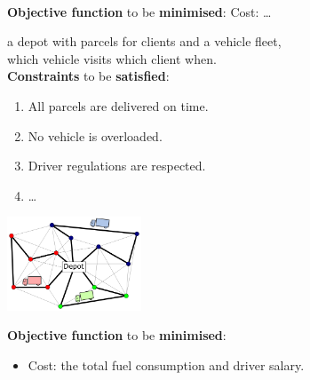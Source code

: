 \documentclass{cons-beamer}
\begin{document}
\begin{frame}
\begin{example}
\begin{minipage}[c]{0.49\textwidth}
    \end{minipage}
    \hfill
    \begin{minipage}[c]{0.50\textwidth}
    \end{minipage} \\[+5pt]
    \textbf{Objective function} to be \textbf{minimised}:
    Cost: \dots
  \end{example}
\end{frame}

\begin{frame}
  \begin{example}
     a depot with parcels for clients and a vehicle
    fleet, \\  which vehicle visits which client when. 
    \\ [+1mm]

    \textbf{Constraints} to be \textbf{satisfied}: \\
    \begin{minipage}[c]{0.59\textwidth}
      \begin{enumerate}
        \item All parcels are delivered on time. \vfill
        \item No vehicle is overloaded. \vfill
        \item Driver regulations are respected. \vfill
        \item \dots
      \end{enumerate}
    \end{minipage}
    \hfill
    \begin{minipage}[c]{0.40\textwidth}
      \includegraphics[width=40mm]{images/VRP}
    \end{minipage} \vfill
    \textbf{Objective function} to be \textbf{minimised}:
    \begin{itemize}
      \item Cost: the total fuel consumption and driver salary.
    \end{itemize}
  \end{example}\vfill


\end{frame}
\end{document}
